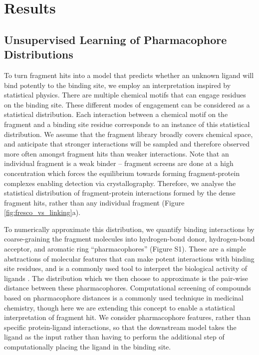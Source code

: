 \section{Results} \label{sec:results}

\subsection{Unsupervised Learning of Pharmacophore Distributions} \label{subsec:model}

To turn fragment hits into a model that predicts whether an unknown ligand will bind potently to the binding site, we employ an interpretation inspired by statistical physics. There are multiple chemical motifs that can engage residues on the binding site. These different modes of engagement can be considered as a statistical distribution. Each interaction between a chemical motif on the fragment and a binding site residue corresponds to an instance of this statistical distribution. We assume that the fragment library broadly covers chemical space, and anticipate that stronger interactions will be sampled and therefore observed more often amongst fragment hits than weaker interactions. Note that an individual fragment is a weak binder -- fragment screens are done at a high concentration which forces the equilibrium towards forming fragment-protein complexes enabling detection via crystallography. Therefore, we analyse the statistical distribution of fragment-protein interactions formed by the dense fragment hits, rather than any individual fragment (Figure \ref{fig:fresco_vs_linking}a).

To numerically approximate this distribution, we quantify binding interactions by coarse-graining the fragment molecules into hydrogen-bond donor, hydrogen-bond acceptor, and aromatic ring ``pharmacophores'' (Figure S1). These are a simple abstractions of molecular features that can make potent interactions with binding site residues, and is a commonly used tool to interpret the biological activity of ligands \cite{Kaserer2015PharmacophoreReview}. The distribution which we then choose to approximate is the pair-wise distance between these pharmacophores. Computational screening of compounds based on pharmacophore distances is a commonly used technique in medicinal chemistry, though here we are extending this concept to enable a statistical interpretation of fragment hit. We consider pharmacophore features, rather than specific protein-ligand interactions, so that the downstream model takes the ligand as the input rather than having to perform the additional step of computationally placing the ligand in the binding site. 

